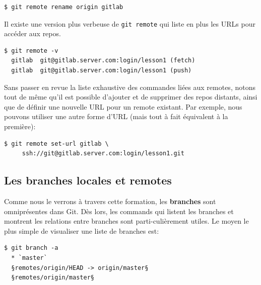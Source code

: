 \documentclass{../../common/tufte-latex/tufte-handout}
\begin{document}
\begin{lstlisting}[style=BashInputStyle]
  $ git remote rename origin gitlab
\end{lstlisting}

Il existe une version plus verbeuse de \texttt{git remote} qui liste en plus les URLs pour accéder aux repos.

\begin{lstlisting}[style=BashInputStyle]
  $ git remote -v
  gitlab  git@gitlab.server.com:login/lesson1 (fetch)
  gitlab  git@gitlab.server.com:login/lesson1 (push)
\end{lstlisting}

Sans passer en revue la liste exhaustive des commandes liées aux remotes, notons tout de même qu'il est possible d'ajouter et de supprimer des repos distants, ainsi que de définir une nouvelle URL pour un remote existant.
Par exemple, nous pouvons utiliser une autre forme d'URL (mais tout à fait équivalent à la première):


\begin{lstlisting}[style=BashInputStyle]
  $ git remote set-url gitlab \
     ssh://git@gitlab.server.com:login/lesson1.git
\end{lstlisting}

\subsection{Les branches locales et remotes}

Comme nous le verrons à travers cette formation, les \textbf{branches} sont omniprésentes dans Git.
Dès lors, les commands qui listent les branches et montrent les relations entre branches sont parti-culièrement utiles.
Le moyen le plus simple de visualiser une liste de branches est:


\begin{lstlisting}[style=BashInputStyle]
  $ git branch -a
  * `master`
  §remotes/origin/HEAD -> origin/master§
  §remotes/origin/master§
\end{lstlisting}
\end{document}
